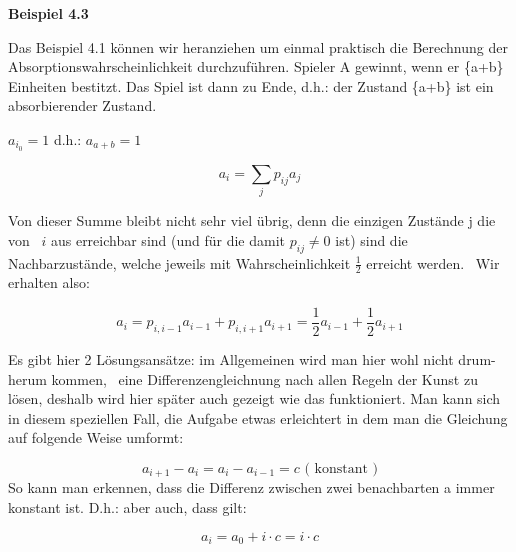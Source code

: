 \begin{uebsp}
{\centering{}\bfseries
Beispiel 4.3
\par}



{
Das Beispiel 4.1 k\"onnen wir heranziehen um einmal praktisch die
Berechnung der Absorptionswahrscheinlichkeit durchzuf\"uhren. Spieler A
gewinnt, wenn er \{a+b\} Einheiten bestitzt. Das Spiel ist dann zu
Ende, d.h.: der Zustand \{a+b\} ist ein absorbierender Zustand.}



{
 $a_{i_{0}}=1$  d.h.:  $a_{a+b}=1$ }



\begin{equation*}
a_{i}=\sum _{j}p_{\mathit{ij}}a_{j}
\end{equation*}


{
Von dieser Summe bleibt nicht sehr viel \"ubrig, denn die einzigen
Zust\"ande j die von \  $i$ aus erreichbar sind (und f\"ur die damit 
$p_{\mathit{ij}}\neq 0$ ist) sind die Nachbarzust\"ande, welche jeweils
mit Wahrscheinlichkeit  $\frac{1}{2}$ erreicht werden. \ Wir erhalten
also:}



\begin{equation*}
a_{i}=p_{i,i-1}a_{i-1}+p_{i,i+1}a_{i+1}=\frac{1}{2}a_{i-1}+\frac{1}{2}a_{i+1}
\end{equation*}


{
Es gibt hier 2 L\"osungsans\"atze: im Allgemeinen wird man hier wohl
nicht drum-herum kommen, \ eine Differenzengleichnung nach allen Regeln
der Kunst zu l\"osen, deshalb wird hier sp\"ater auch gezeigt wie das
funktioniert. Man kann sich in diesem speziellen Fall, die Aufgabe
etwas erleichtert in dem man die Gleichung auf folgende Weise umformt:}



\begin{equation*}
a_{i+1}-a_{i}=a_{i}-a_{i-1}=c\text{ ( konstant )}
\end{equation*}
{
So kann man erkennen, dass die Differenz zwischen zwei benachbarten a
immer konstant ist. D.h.: aber auch, dass gilt:}



\begin{equation*}
a_{i}=a_{0}+i\cdot c=i\cdot c
\end{equation*}


\end{uebsp}
